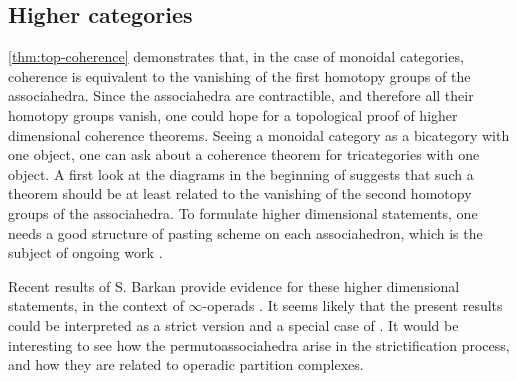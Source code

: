 \subsection{Higher categories} 
\label{sec:higher}
\cref{thm:top-coherence} demonstrates that, in the case of monoidal categories, coherence is equivalent to the vanishing of the first homotopy groups of the associahedra. 
Since the associahedra are contractible, and therefore all their homotopy groups vanish, one could hope for a topological proof of higher dimensional coherence theorems.
Seeing a monoidal category as a bicategory with one object, one can ask about a coherence theorem for tricategories with one object. 
A first look at the diagrams in the beginning of \cite[Section 2]{gordonCoherenceTricategories1995} suggests that such a theorem should be at least related to the vanishing of the second homotopy groups of the associahedra.  
To formulate higher dimensional statements, one needs a good structure of pasting scheme on each associahedron, which is the subject of ongoing work \cite{AMMLA}. 

Recent results of S. Barkan provide evidence for these higher dimensional statements, in the context of $\infty$-operads \cite{barkanArityApproximationInfty2022}.
It seems likely that the present results could be interpreted as a strict version and a special case of \cite[Theorem B]{barkanArityApproximationInfty2022}. 
It would be interesting to see how the permutoassociahedra arise in the strictification process, and how they are related to operadic partition complexes.  
